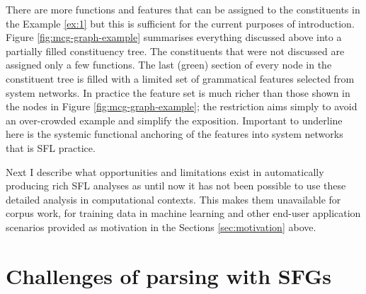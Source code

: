 There are more functions and features that can be assigned to the constituents in the Example \ref{ex:1} but this is sufficient for the current purposes of introduction. Figure \ref{fig:mcg-graph-example} summarises everything discussed above into a partially filled constituency tree. The constituents that were not discussed are assigned only a few functions. %
The last (green) section of every node in the constituent tree is filled with a limited set of grammatical features selected from system networks. In practice the feature set is much richer than those shown in the nodes in Figure \ref{fig:mcg-graph-example}; the restriction aims simply to avoid an over-crowded example and simplify the exposition. Important to underline here is the systemic functional anchoring of the features into system networks that is SFL practice.


Next I describe what opportunities and limitations exist in automatically producing rich SFL analyses as until now it has not been possible to use these detailed analysis in computational contexts. This makes them unavailable for corpus work, for training data in machine learning and other end-user application scenarios provided as motivation in the Sections \ref{sec:motivation} above.

\section{Challenges of parsing with SFGs}
\label{sec:problem}


